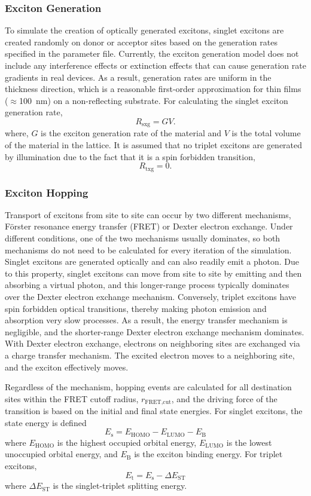 \documentclass[%
 reprint,onecolumn,notitlepage,
superscriptaddress,longbibliography,
 amsmath,amssymb,
 aps,rmp,floatfix,
]{revtex4-1}
\begin{document}
\subsubsection{Exciton Generation}

To simulate the creation of optically generated excitons, singlet excitons are created randomly on donor or acceptor sites based on the generation rates specified in the parameter file. 
Currently, the exciton generation model does not include any interference effects or extinction effects that can cause generation rate gradients in real devices. As a result, generation rates are uniform in the thickness direction, which is a reasonable first-order approximation for thin films ($\approx$100~nm) on a non-reflecting substrate. 
For calculating the singlet exciton generation rate,
$$R_\text{sxg} = G V.$$
where, $G$ is the exciton generation rate of the material and $V$ is the total volume of the material in the lattice.
It is assumed that no triplet excitons are generated by illumination due to the fact that it is a spin forbidden transition,
$$R_\text{txg} = 0.$$

\subsubsection{Exciton Hopping}

Transport of excitons from site to site can occur by two different mechanisms, F{\"o}rster resonance energy transfer (FRET)\cite{forster1948} or Dexter electron exchange.\cite{dexter1953jcp} 
Under different conditions, one of the two mechanisms usually dominates, so both mechanisms do not need to be calculated for every iteration of the simulation. 
Singlet excitons are generated optically and can also readily emit a photon. 
Due to this property, singlet excitons can move from site to site by emitting and then absorbing a virtual photon, and this longer-range process typically dominates over the Dexter electron exchange mechanism. 
Conversely, triplet excitons have spin forbidden optical transitions, thereby making photon emission and absorption very slow processes. 
As a result, the energy transfer mechanism is negligible, and the shorter-range Dexter electron exchange mechanism dominates. 
With Dexter electron exchange, electrons on neighboring sites are exchanged via a charge transfer mechanism. 
The excited electron moves to a neighboring site, and the exciton effectively moves.

Regardless of the mechanism, hopping events are calculated for all destination sites within the FRET cutoff radius, $r_{\text{FRET,cut}}$, and the driving force of the transition is based on the initial and final state energies.
For singlet excitons, the state energy is defined
$$E_{\text{s}} = E_\text{HOMO} - E_\text{LUMO} - E_\text{B}$$
where $E_\text{HOMO}$ is the highest occupied orbital energy, $E_\text{LUMO}$ is the lowest unoccupied orbital energy, and $E_\text{B}$ is the exciton binding energy.
For triplet excitons, 
$$E_{\text{t}} = E_\text{s} - \Delta E_\text{ST}$$
where $\Delta E_\text{ST}$ is the singlet-triplet splitting energy.
\end{document}
